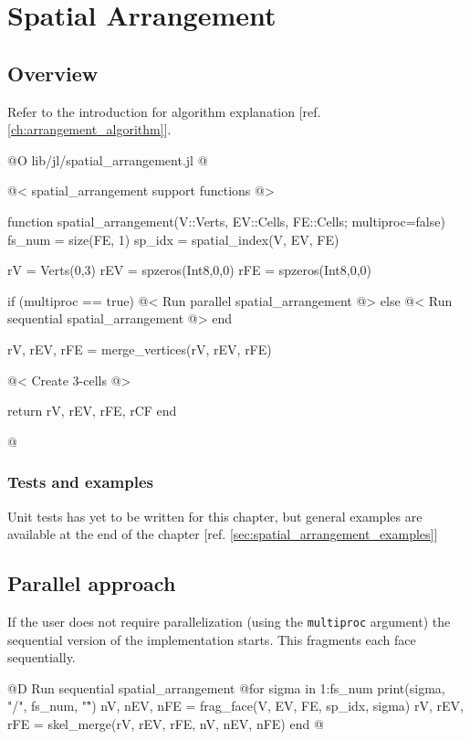 \chapter{Spatial Arrangement}
\label{ch:spatial_arrangement}

\section{Overview}
Refer to the introduction for algorithm explanation
[ref. \ref{ch:arrangement_algorithm}].

@O lib/jl/spatial_arrangement.jl
@{@< spatial\_arrangement support functions @>


function spatial_arrangement(V::Verts, EV::Cells, FE::Cells; multiproc=false)
    fs_num = size(FE, 1)
    sp_idx = spatial_index(V, EV, FE)

    rV = Verts(0,3)
    rEV = spzeros(Int8,0,0)
    rFE = spzeros(Int8,0,0)

    if (multiproc == true)
        @< Run parallel spatial\_arrangement @>
    else
        @< Run sequential spatial\_arrangement @>
    end

    rV, rEV, rFE = merge_vertices(rV, rEV, rFE)

    @< Create 3-cells @>

    return rV, rEV, rFE, rCF
end

@}

\subsection{Tests and examples}

Unit tests has yet to be written for this chapter, but general
examples are available at the end of the chapter [ref. \ref{sec:spatial_arrangement_examples}]




\section{Parallel approach}

If the user does not require parallelization 
(using the \texttt{multiproc} argument) the sequential version
of the implementation starts. This fragments each face sequentially.

@D Run sequential spatial\_arrangement
@{for sigma in 1:fs_num
    print(sigma, "/", fs_num, "\r")
    nV, nEV, nFE = frag_face(V, EV, FE, sp_idx, sigma)
    rV, rEV, rFE = skel_merge(rV, rEV, rFE, nV, nEV, nFE)
end
@}

